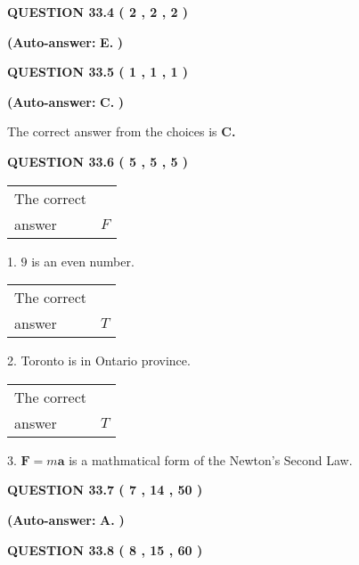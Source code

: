 \documentclass[12pt]{article}
\begin{document}
 
  
  
{\textbf{\large{QUESTION
33.4 
 (           2 ,           2 ,           2 )
}}}
 
 
{\textbf{(Auto-answer:}}
{\textbf{\large{
E.}}}
{\textbf{)}}
 
 
  
  
{\textbf{\large{QUESTION
33.5 
 (           1 ,           1 ,           1 )
}}}
 
 
{\textbf{(Auto-answer:}}
{\textbf{\large{
C.}}}
{\textbf{)}}
 
 

The correct answer from the choices is
{\textbf{\large{
C.}}}
 
  
  
{\textbf{\large{QUESTION
33.6 
 (           5 ,           5 ,           5 )
}}}

 
\noindent\begin{tabular}{|l|l|}\hline The correct & \\
          answer &  %
$F$ \\ \hline \end{tabular}
1. $ %
9$ is an  %
even number.
 
\noindent\begin{tabular}{|l|l|}\hline The correct & \\
          answer &  %
$T$ \\ \hline \end{tabular}
2.  %
Toronto is in  %
Ontario province.
 
\noindent\begin{tabular}{|l|l|}\hline The correct & \\
          answer &  %
$T$ \\ \hline \end{tabular}
3.  %
$\mathbf{F}=m\mathbf{a}$ is a mathmatical form of  %
the Newton's Second Law.
 
  
  
{\textbf{\large{QUESTION
33.7 
 (           7 ,          14 ,          50 )
}}}
 
 
{\textbf{(Auto-answer:}}
{\textbf{\large{
A.}}}
{\textbf{)}}
 
 
  
  
{\textbf{\large{QUESTION
33.8 
 (           8 ,          15 ,          60 )
}}}
\end{document}
